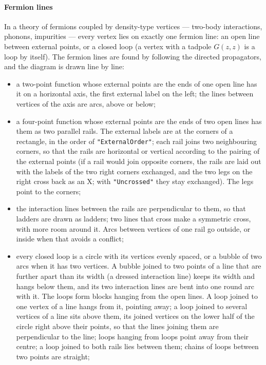 \documentclass[11pt,a4paper]{article}
\newcommand{\opt}[1]{\texttt{"#1"}}
\begin{document}
\paragraph{Fermion lines} In a theory of fermions coupled by density-type vertices --- two-body interactions, phonons,
impurities --- every vertex lies on exactly one fermion line: an open line between external points, or a closed loop (a
vertex with a tadpole $G(z,z)$ is a loop by itself). The fermion lines are found by following the directed propagators,
and the diagram is drawn line by line:
\begin{itemize}
\item a two-point function whose external points are the ends of one open line has it on a horizontal axis, the first
  external label on the left; the lines between vertices of the axis are arcs, above or below;
\item a four-point function whose external points are the ends of two open lines has them as two parallel rails. The
  external labels are at the corners of a rectangle, in the order of \opt{ExternalOrder}; each rail joins two neighbouring
  corners, so that the rails are horizontal or vertical according to the pairing of the external points (if a rail would
  join opposite corners, the rails are laid out with the labels of the two right corners exchanged, and the two legs on
  the right cross back as an X; with \texttt{"Uncrossed"} they stay exchanged). The legs point to the corners;
\item the interaction lines between the rails are perpendicular to them, so that ladders are drawn as ladders; two lines
  that cross make a symmetric cross, with more room around it. Arcs between vertices of one rail go outside, or inside
  when that avoids a conflict;
\item every closed loop is a circle with its vertices evenly spaced, or a bubble of two arcs when it has two vertices.
  A bubble joined to two points of a line that are further apart than its width (a dressed interaction line) keeps its
  width and hangs below them, and its two interaction lines are bent into one round arc with it.
  The loops form blocks hanging from the open lines. A loop joined to one vertex of a line hangs from it, pointing away;
  a loop joined to several vertices of a line sits above them, its joined vertices on the lower half of the circle right
  above their points, so that the lines joining them are perpendicular to the line; loops hanging from loops point away
  from their centre; a loop joined to both rails lies between them; chains of loops between two points are straight;

\end{itemize}
\end{document}
